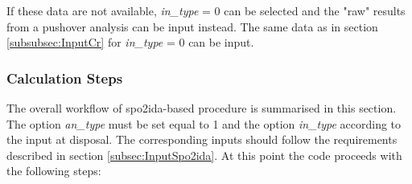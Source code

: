 If these data are not available, \textit{in\_type} = 0 can be selected and the "raw" results from a pushover analysis can be input instead. The same data as in section \ref{subsubsec:InputCr} for \textit{in\_type} = 0 can be input.

\subsubsection{Calculation Steps}
The overall workflow of spo2ida-based procedure is summarised in this section. The option \textit{an\_type} must be set equal to 1 and the option \textit{in\_type} according to the input at disposal. The corresponding inputs should follow the requirements described in section \ref{subsec:InputSpo2ida}. At this point the code proceeds with the following steps:

